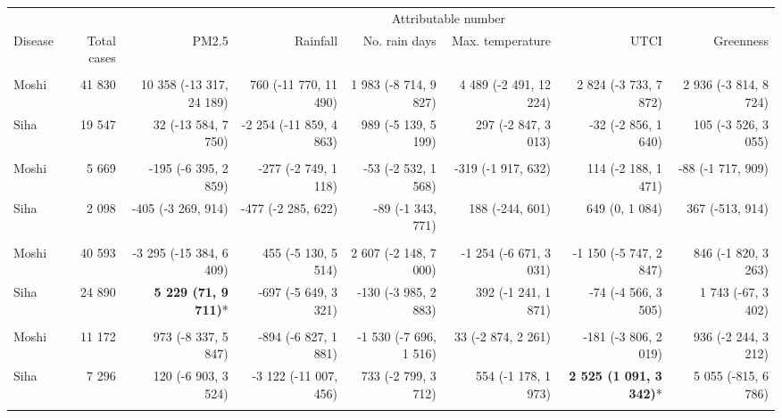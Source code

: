 \begin{table}[t]
\fontsize{12.0pt}{14.4pt}\selectfont
\begin{tabular*}{\linewidth}{@{\extracolsep{\fill}}l|rrrrrrr}
\toprule
 &  & \multicolumn{6}{c}{Attributable number} \\ 
\cmidrule(lr){3-8}
Disease & Total cases & PM2.5 & Rainfall & No. rain days & Max. temperature & UTCI & Greenness \\ 
\midrule\addlinespace[2.5pt]
\multicolumn{8}{l}{Pneumonia, Severe} \\[2.5pt] 
\midrule\addlinespace[2.5pt]
Moshi & 41 830 & 10 358 (-13 317, 24 189) & 760 (-11 770, 11 490) & 1 983 (-8 714, 9 827) & 4 489 (-2 491, 12 224) & 2 824 (-3 733, 7 872) & 2 936 (-3 814, 8 724) \\ 
Siha & 19 547 & 32 (-13 584, 7 750) & -2 254 (-11 859, 4 863) & 989 (-5 139, 5 199) & 297 (-2 847, 3 013) & -32 (-2 856, 1 640) & 105 (-3 526, 3 055) \\ 
\midrule\addlinespace[2.5pt]
\multicolumn{8}{l}{Tuberculosis} \\[2.5pt] 
\midrule\addlinespace[2.5pt]
Moshi & 5 669 & -195 (-6 395, 2 859) & -277 (-2 749, 1 118) & -53 (-2 532, 1 568) & -319 (-1 917, 632) & 114 (-2 188, 1 471) & -88 (-1 717, 909) \\ 
Siha & 2 098 & -405 (-3 269, 914) & -477 (-2 285, 622) & -89 (-1 343, 771) & 188 (-244, 601) & 649 (0, 1 084) & 367 (-513, 914) \\ 
\midrule\addlinespace[2.5pt]
\multicolumn{8}{l}{Skin Infection - Fungal} \\[2.5pt] 
\midrule\addlinespace[2.5pt]
Moshi & 40 593 & -3 295 (-15 384, 6 409) & 455 (-5 130, 5 514) & 2 607 (-2 148, 7 000) & -1 254 (-6 671, 3 031) & -1 150 (-5 747, 2 847) & 846 (-1 820, 3 263) \\ 
Siha & 24 890 & \textbf{5 229 (71, 9 711)}* & -697 (-5 649, 3 321) & -130 (-3 985, 2 883) & 392 (-1 241, 1 871) & -74 (-4 566, 3 505) & 1 743 (-67, 3 402) \\ 
\midrule\addlinespace[2.5pt]
\multicolumn{8}{l}{Malnutrition} \\[2.5pt] 
\midrule\addlinespace[2.5pt]
Moshi & 11 172 & 973 (-8 337, 5 847) & -894 (-6 827, 1 881) & -1 530 (-7 696, 1 516) & 33 (-2 874, 2 261) & -181 (-3 806, 2 019) & 936 (-2 244, 3 212) \\ 
Siha & 7 296 & 120 (-6 903, 3 524) & -3 122 (-11 007, 456) & 733 (-2 799, 3 712) & 554 (-1 178, 1 973) & \textbf{2 525 (1 091, 3 342)}* & 5 055 (-815, 6 786) \\ 
\midrule\addlinespace[2.5pt]

\end{tabular*}
\end{table}
